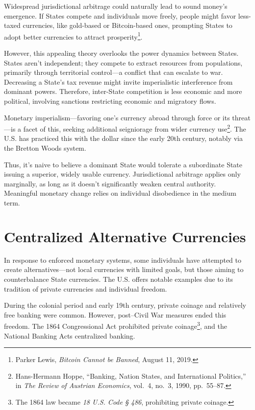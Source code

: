 \documentclass[
  a5paper,
  smalldemyvopaper,10pt,twoside,onecolumn,openright,extrafontsizes,hidelinks]{memoir}
\begin{document}
Widespread jurisdictional arbitrage could naturally lead to sound
money's emergence. If States compete and individuals move freely, people
might favor less-taxed currencies, like gold-based or Bitcoin-based
ones, prompting States to adopt better currencies to attract
prosperity\footnote{Parker Lewis, \emph{Bitcoin Cannot be Banned},
  August 11, 2019.}.

However, this appealing theory overlooks the power dynamics between
States. States aren't independent; they compete to extract resources
from populations, primarily through territorial control---a conflict
that can escalate to war. Decreasing a State's tax revenue might invite
imperialistic interference from dominant powers. Therefore, inter-State
competition is less economic and more political, involving sanctions
restricting economic and migratory flows.

Monetary imperialism---favoring one's currency abroad through force or
its threat---is a facet of this, seeking additional seigniorage from
wider currency use\footnote{Hans-Hermann Hoppe, ``Banking, Nation
  States, and International Politics,'' in \emph{The Review of Austrian
  Economics}, vol.~4, no.~3, 1990, pp.~55--87.}. The U.S. has practiced
this with the dollar since the early 20th century, notably via the
Bretton Woods system.

Thus, it's naive to believe a dominant State would tolerate a
subordinate State issuing a superior, widely usable currency.
Jurisdictional arbitrage applies only marginally, as long as it doesn't
significantly weaken central authority. Meaningful monetary change
relies on individual disobedience in the medium term.

\section*{Centralized Alternative
Currencies}\label{les-monnaies-alternatives-centralisuxe9es}


In response to enforced monetary systems, some individuals have
attempted to create alternatives---not local currencies with limited
goals, but those aiming to counterbalance State currencies. The U.S.
offers notable examples due to its tradition of private currencies and
individual freedom.

During the colonial period and early 19th century, private coinage and
relatively free banking were common. However, post--Civil War measures
ended this freedom. The 1864 Congressional Act prohibited private
coinage\footnote{The 1864 law became \emph{18 U.S. Code § 486},
  prohibiting private coinage.}, and the National Banking Acts
centralized banking.
\end{document}
